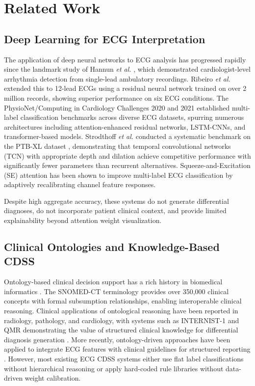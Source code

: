 \documentclass[journal]{IEEEtran}
\begin{document}
\section{Related Work}
\label{sec:related}

\subsection{Deep Learning for ECG Interpretation}

The application of deep neural networks to ECG analysis has
progressed rapidly since the landmark study of Hannun
\textit{et al.} \cite{hannun2019cardiologist}, which demonstrated
cardiologist-level arrhythmia detection from single-lead ambulatory
recordings.
Ribeiro \textit{et al.} \cite{ribeiro2020automatic} extended this
to 12-lead ECGs using a residual neural network trained on over
2 million records, showing superior performance on six ECG conditions.
The PhysioNet/Computing in Cardiology Challenges 2020 and 2021
\cite{reyna2020physionet,reyna2021physionet} established multi-label
classification benchmarks across diverse ECG datasets, spurring
numerous architectures including attention-enhanced
residual networks, LSTM-CNNs, and transformer-based models.
Strodthoff \textit{et al.} \cite{strodthoff2020deep} conducted a
systematic benchmark on the PTB-XL dataset \cite{wagner2020ptb},
demonstrating that temporal convolutional networks (TCN)
\cite{bai2018empirical} with appropriate depth and dilation achieve
competitive performance with significantly fewer parameters than
recurrent alternatives.
Squeeze-and-Excitation (SE) attention \cite{hu2018squeeze} has
been shown to improve multi-label ECG classification by adaptively
recalibrating channel feature responses.

Despite high aggregate accuracy, these systems do not generate
differential diagnoses, do not incorporate patient clinical context,
and provide limited explainability beyond attention weight
visualization.

\subsection{Clinical Ontologies and Knowledge-Based CDSS}

Ontology-based clinical decision support has a rich history in
biomedical informatics \cite{shortliffe2001biomedical}.
The SNOMED-CT terminology \cite{snomedct} provides over 350,000
clinical concepts with formal subsumption relationships, enabling
interoperable clinical reasoning.
Clinical applications of ontological reasoning have been reported in
radiology, pathology, and cardiology, with systems such as
INTERNIST-1 and QMR demonstrating the value of structured clinical
knowledge for differential diagnosis generation
\cite{miller1982internist}.
More recently, ontology-driven approaches have been applied to
integrate ECG features with clinical guidelines for structured
reporting \cite{beinlich2018ecg}.
However, most existing ECG CDSS systems either use flat label
classifications without hierarchical reasoning or apply hard-coded
rule libraries without data-driven weight calibration.
\end{document}
